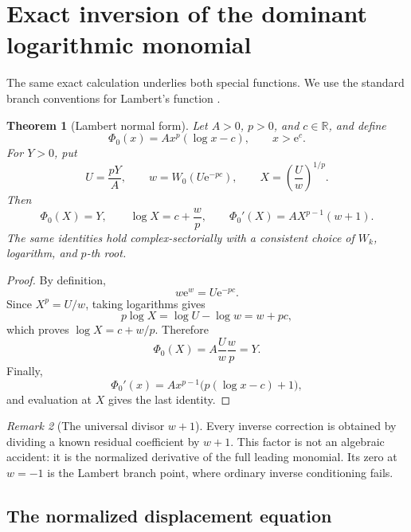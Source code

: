 \documentclass[11pt]{article}
\newtheorem{theorem}{Theorem}[section]
\theoremstyle{definition}
\theoremstyle{remark}
\newtheorem{remark}[theorem]{Remark}
\newcommand{\e}{\mathrm e}
\newcommand{\R}{\mathbb R}
\begin{document}
\section{Exact inversion of the dominant logarithmic monomial}\label{sec:dominant}

The same exact calculation underlies both special functions.  We use the standard branch conventions for Lambert's function \cite{CorlessW,DLMF}.

\begin{theorem}[Lambert normal form]\label{thm:lambert-normal}
Let \(A>0\), \(p>0\), and \(c\in\R\), and define
\[
 \Phi_0(x)=A x^p(\log x-c),\qquad x>\e^c.
\]
For \(Y>0\), put
\begin{equation}\label{eq:general-scales}
 U=\frac{pY}{A},\qquad
 w=W_0\!\left(U\e^{-pc}\right),\qquad
 X=\left(\frac{U}{w}\right)^{1/p}.
\end{equation}
Then
\begin{equation}\label{eq:dominant-exact}
 \Phi_0(X)=Y,
 \qquad
 \log X=c+\frac{w}{p},
 \qquad
 \Phi_0'(X)=A X^{p-1}(w+1).
\end{equation}
The same identities hold complex-sectorially with a consistent choice of
\(W_k\), logarithm, and \(p\)-th root.
\end{theorem}

\begin{proof}
By definition,
\[
 w\e^w=U\e^{-pc}.
\]
Since \(X^p=U/w\), taking logarithms gives
\[
 p\log X=\log U-\log w=w+pc,
\]
which proves \(\log X=c+w/p\).  Therefore
\[
 \Phi_0(X)=A\frac{U}{w}\frac{w}{p}=Y.
\]
Finally,
\[
 \Phi_0'(x)=A x^{p-1}\bigl(p(\log x-c)+1\bigr),
\]
and evaluation at \(X\) gives the last identity.
\end{proof}

\begin{remark}[The universal divisor \(w+1\)]
Every inverse correction is obtained by dividing a known residual coefficient by \(w+1\).  This factor is not an algebraic accident: it is the normalized derivative of the full leading monomial.  Its zero at \(w=-1\) is the Lambert branch point, where ordinary inverse conditioning fails.
\end{remark}

\subsection{The normalized displacement equation}
\end{document}
